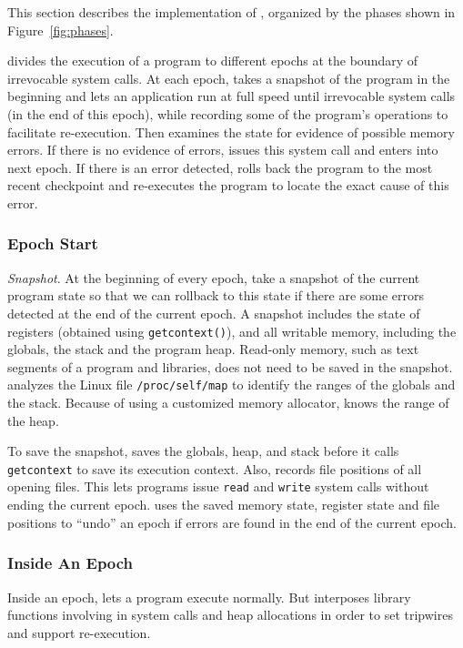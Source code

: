 \label{sec:implementation}

This section describes the implementation of \doubletake{}, organized by the phases shown in Figure~\ref{fig:phases}. 

\doubletake{} divides the execution of a program to different epochs at the boundary of irrevocable system calls. At each epoch, \doubletake{} takes a snapshot of the program in the beginning and lets an application run at full speed until irrevocable system calls (in the end of this epoch), while recording some of the program's operations to facilitate re-execution. Then \doubletake{} examines the state for evidence of possible memory errors. 
If there is no evidence of errors, \doubletake{} issues this system call and enters into next epoch. If there is an error detected, \doubletake{} rolls back the program to the most recent checkpoint and re-executes the program to locate the exact cause of this error. 

\subsubsection{Epoch Start}
{\em Snapshot}. 
At the beginning of every epoch, \doubletake{} take a snapshot of the current program state 
so that we can rollback to this state if there are some errors detected at the end of the current epoch. A snapshot includes the state of registers (obtained using \texttt{getcontext()}),
and all writable memory, including the globals, the stack and the program heap. 
Read-only memory, such as text segments of a program and libraries, does not need to 
be saved in the snapshot. \doubletake{} analyzes the Linux file \texttt{/proc/self/map} 
to identify the ranges of the globals and the stack. Because of using a customized memory allocator, \doubletake{} knows the range of the heap. 

To save the snapshot, \doubletake{} saves the globals, heap, and stack before it calls \texttt{getcontext} to save its execution context. Also, \doubletake{} records file positions of all opening files. This lets programs issue \texttt{read} and \texttt{write} system calls without 
ending the current epoch. \doubletake{} uses the saved memory state, register state and file positions to ``undo'' an epoch if errors are found in the end of the current epoch. 

\subsubsection{Inside An Epoch}
\label{sec:inepoch}
Inside an epoch, \doubletake{} lets a program execute normally. But \doubletake{} interposes  library functions involving in system calls and heap allocations in order to set tripwires and support re-execution.

